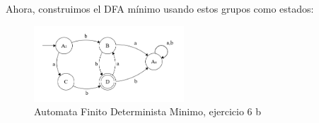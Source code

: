     Ahora, construimos el DFA mínimo usando estos grupos como estados:
    \begin{figure}[ht]
        \centering
        \includegraphics[width=0.5\textwidth]{images/6bresuelto.png}
        \caption{Automata Finito Determinista Minimo, ejercicio 6 b}
    \end{figure}
